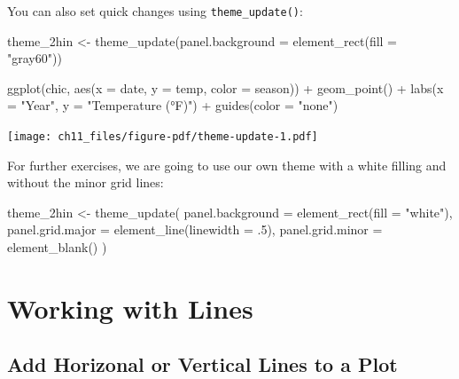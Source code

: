 \documentclass[
  letterpaper,
]{scrbook}
\newenvironment{Shaded}{\begin{snugshade}}{\end{snugshade}}
\newcommand{\AttributeTok}[1]{\textcolor[rgb]{0.40,0.45,0.13}{#1}}
\newcommand{\DecValTok}[1]{\textcolor[rgb]{0.68,0.00,0.00}{#1}}
\newcommand{\FunctionTok}[1]{\textcolor[rgb]{0.28,0.35,0.67}{#1}}
\newcommand{\NormalTok}[1]{\textcolor[rgb]{0.00,0.23,0.31}{#1}}
\newcommand{\OtherTok}[1]{\textcolor[rgb]{0.00,0.23,0.31}{#1}}
\newcommand{\SpecialCharTok}[1]{\textcolor[rgb]{0.37,0.37,0.37}{#1}}
\newcommand{\StringTok}[1]{\textcolor[rgb]{0.13,0.47,0.30}{#1}}
\begin{document}
You can also set quick changes using \texttt{theme\_update()}:

\begin{Shaded}
\begin{Highlighting}[]
\NormalTok{theme\_2hin }\OtherTok{\textless{}{-}} \FunctionTok{theme\_update}\NormalTok{(}\AttributeTok{panel.background =} \FunctionTok{element\_rect}\NormalTok{(}\AttributeTok{fill =} \StringTok{"gray60"}\NormalTok{))}

\FunctionTok{ggplot}\NormalTok{(chic, }\FunctionTok{aes}\NormalTok{(}\AttributeTok{x =}\NormalTok{ date, }\AttributeTok{y =}\NormalTok{ temp, }\AttributeTok{color =}\NormalTok{ season)) }\SpecialCharTok{+}
  \FunctionTok{geom\_point}\NormalTok{() }\SpecialCharTok{+} \FunctionTok{labs}\NormalTok{(}\AttributeTok{x =} \StringTok{"Year"}\NormalTok{, }\AttributeTok{y =} \StringTok{"Temperature (°F)"}\NormalTok{) }\SpecialCharTok{+} \FunctionTok{guides}\NormalTok{(}\AttributeTok{color =} \StringTok{"none"}\NormalTok{)}
\end{Highlighting}
\end{Shaded}

\texttt{[image: ch11\_files/figure-pdf/theme-update-1.pdf]}

For further exercises, we are going to use our own theme with a white
filling and without the minor grid lines:

\begin{Shaded}
\begin{Highlighting}[]
\NormalTok{theme\_2hin }\OtherTok{\textless{}{-}} \FunctionTok{theme\_update}\NormalTok{(}
  \AttributeTok{panel.background =} \FunctionTok{element\_rect}\NormalTok{(}\AttributeTok{fill =} \StringTok{"white"}\NormalTok{),}
  \AttributeTok{panel.grid.major =} \FunctionTok{element\_line}\NormalTok{(}\AttributeTok{linewidth =}\NormalTok{ .}\DecValTok{5}\NormalTok{),}
  \AttributeTok{panel.grid.minor =} \FunctionTok{element\_blank}\NormalTok{()}
\NormalTok{)}
\end{Highlighting}
\end{Shaded}


\chapter{Working with Lines}\label{lines}

\section{Add Horizonal or Vertical Lines to a
Plot}\label{add-horizonal-or-vertical-lines-to-a-plot}
\end{document}

